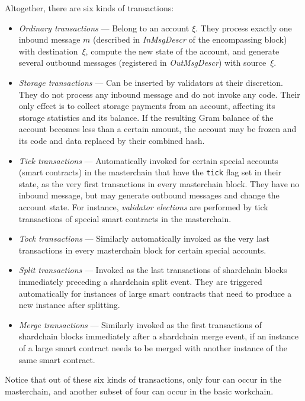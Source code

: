\documentclass[12pt,oneside]{article}
\begin{document}
Altogether, there are six kinds of transactions:
\begin{itemize}
\item {\em Ordinary transactions\/} --- Belong to an account $\xi$. They process exactly one inbound message $m$ (described in {\em InMsgDescr\/} of the encompassing block) with destination~$\xi$, compute the new state of the account, and generate several outbound messages (registered in {\em OutMsgDescr}) with source~$\xi$.
\item {\em Storage transactions\/} --- Can be inserted by validators at their discretion. They do not process any inbound message and do not invoke any code. Their only effect is to collect storage payments from an account, affecting its storage statistics and its balance. If the resulting Gram balance of the account becomes less than a certain amount, the account may be frozen and its code and data replaced by their combined hash.
\item {\em Tick transactions\/} --- Automatically invoked for certain special accounts (smart contracts) in the masterchain that have the {\tt tick} flag set in their state, as the very first transactions in every masterchain block. They have no inbound message, but may generate outbound messages and change the account state. For instance, {\em validator elections\/} are performed by tick transactions of special smart contracts in the masterchain.
\item {\em Tock transactions\/} --- Similarly automatically invoked as the very last transactions in every masterchain block for certain special accounts.
\item {\em Split transactions\/} --- Invoked as the last transactions of shardchain blocks immediately preceding a shardchain split event. They are triggered automatically for instances of large smart contracts that need to produce a new instance after splitting.
\item {\em Merge transactions\/} --- Similarly invoked as the first transactions of shardchain blocks immediately after a shardchain merge event, if an instance of a large smart contract needs to be merged with another instance of the same smart contract.
\end{itemize}
Notice that out of these six kinds of transactions, only four can occur in the masterchain, and another subset of four can occur in the basic workchain.
\end{document}
